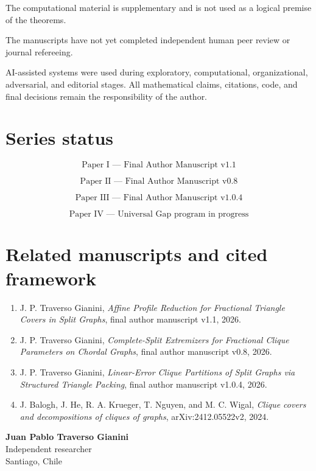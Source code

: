 \documentclass[11pt,a4paper]{article}
\begin{document}
The computational material is supplementary and is not used as a logical premise of the theorems.

The manuscripts have not yet completed independent human peer review or journal refereeing.

AI-assisted systems were used during exploratory, computational, organizational, adversarial, and editorial stages. All mathematical claims, citations, code, and final decisions remain the responsibility of the author.

\section{Series status}

\[
\boxed{\text{Paper I --- Final Author Manuscript v1.1}}
\]

\[
\boxed{\text{Paper II --- Final Author Manuscript v0.8}}
\]

\[
\boxed{\text{Paper III --- Final Author Manuscript v1.0.4}}
\]

\[
\boxed{\text{Paper IV --- Universal Gap program in progress}}
\]

\section{Related manuscripts and cited framework}

\begin{enumerate}
\item J. P. Traverso Gianini, \emph{Affine Profile Reduction for Fractional Triangle Covers in Split Graphs}, final author manuscript v1.1, 2026.
\item J. P. Traverso Gianini, \emph{Complete-Split Extremizers for Fractional Clique Parameters on Chordal Graphs}, final author manuscript v0.8, 2026.
\item J. P. Traverso Gianini, \emph{Linear-Error Clique Partitions of Split Graphs via Structured Triangle Packing}, final author manuscript v1.0.4, 2026.
\item J. Balogh, J. He, R. A. Krueger, T. Nguyen, and M. C. Wigal, \emph{Clique covers and decompositions of cliques of graphs}, arXiv:2412.05522v2, 2024.
\end{enumerate}

\vfill
\begin{center}
\textbf{Juan Pablo Traverso Gianini}\\
Independent researcher\\
Santiago, Chile
\end{center}
\end{document}
